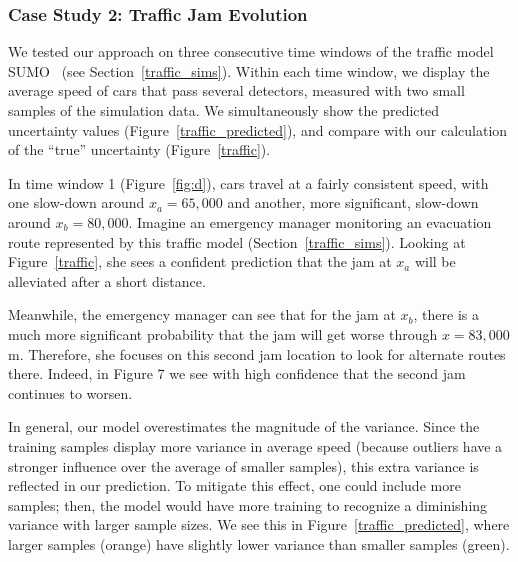 \subsubsection{Case Study 2: Traffic Jam Evolution}
We tested our approach on three consecutive time windows of the traffic model SUMO~\cite{SUMO2012} (see Section~\ref{traffic_sims}). Within each time window, we display the average speed of cars that pass several detectors, measured with two small samples of the simulation data. We simultaneously show the predicted uncertainty values (Figure~\ref{traffic_predicted}), and compare with our calculation of the ``true'' uncertainty (Figure~\ref{traffic}).  

In time window 1 (Figure~\ref{fig:d}), cars travel at a fairly consistent speed, with one slow-down around $x_a = 65,000$ and another, more significant, slow-down around $x_b = 80,000$. Imagine an emergency manager monitoring an evacuation route represented by this traffic model (Section~\ref{traffic_sims}). Looking at Figure~\ref{traffic}, she sees a confident prediction that the jam at $x_a$ will be alleviated after a short distance. 

Meanwhile, the emergency manager can see that for the jam at $x_b$, there is a much more significant probability that the jam will get worse through $x=83,000$m. Therefore, she focuses on this second jam location to look for alternate routes there. Indeed, in Figure 7 we see with high confidence that the second jam continues to worsen.

In general, our model overestimates the magnitude of the variance. Since the training samples display more variance in average speed (because outliers have a stronger influence over the average of smaller samples), this extra variance is reflected in our prediction. To mitigate this effect, one could include more samples; then, the model would have more training to recognize a diminishing variance with larger sample sizes. We see this in Figure~\ref{traffic_predicted}, where larger samples (orange) have slightly lower variance than smaller samples (green).

